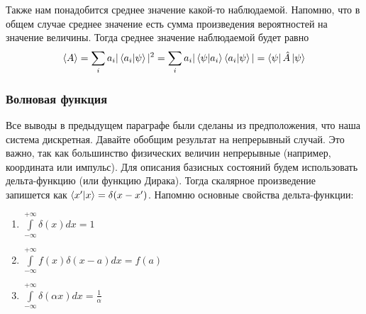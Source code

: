 Также нам понадобится среднее значение какой-то наблюдаемой. Напомню, что в общем случае среднее значение есть сумма произведения вероятностей на значение величины. Тогда среднее значение наблюдаемой будет равно
\[
\langle A \rangle = \sum_i a_i |\bra{a_i}\ket{\psi}|^2 = \sum_i a_i |\bra{\psi}\ket{a_i}\bra{a_i}\ket{\psi}| = \bra{\psi}\hat{A}\ket{\psi}
\]
\subsubsection*{Волновая функция}
\hspace{1em} Все выводы в предыдущем параграфе были сделаны из предположения, что наша система дискретная. Давайте обобщим результат на непрерывный случай. Это важно, так как большинство физических величин непрерывные (например, координата или импульс). Для описания базисных состояний будем использовать дельта-функцию (или функцию Дирака). Тогда скалярное произведение запишется как $\bra{x'}\ket{x} = \delta(x - x')$. Напомню основные свойства дельта-функции:
\begin{enumerate}
    \item $\int\limits_{-\infty}^{+\infty}\delta(x)dx = 1$
    \item $\int\limits^{+\infty}_{-\infty}f(x)\delta(x-a)dx = f(a)$
    \item $\int\limits^{+\infty}_{-\infty}\delta(\alpha x)dx = \frac{1}{\alpha}$
\end{enumerate}

